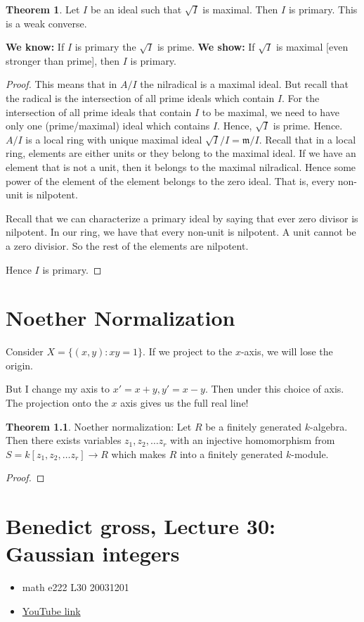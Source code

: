 \documentclass{book}
\newcommand{\m}{\mathfrak{m}}
\newcommand{\rad}{\sqrt} %
\theoremstyle{definition}
\newtheorem{theorem}{Theorem}
\begin{document}
\begin{theorem}
Let $I$ be an ideal such that $\rad I$ is maximal. Then $I$ is primary.
This is a weak converse.

\textbf{We know:} If $I$ is primary the $\rad I$ is prime.
\textbf{We show:}
If $\rad I$ is maximal [even stronger than prime], then $I$ is primary.
\end{theorem}
\begin{proof}
This means that in $A/I$ the nilradical is a maximal ideal. But recall that
the radical is the intersection of all prime ideals which contain $I$. 
For the intersection of all prime ideals that contain $I$ to be maximal, we
need to have only one (prime/maximal) ideal which contains $I$. Hence,
$\rad I$ is prime. Hence. $A/I$ is a local ring with unique maximal ideal
$\rad I/I = \m/I$. Recall that in a local ring, elements are either units
or they belong to the maximal ideal. If we have an element that is not
a unit, then it belongs to the maximal nilradical. Hence some power of 
the element of the element belongs to the zero ideal. That is, every non-unit
is nilpotent.

Recall that we can characterize a primary ideal by saying that ever zero divisor
is nilpotent. In our ring, we have that every non-unit is nilpotent. A unit
cannot be a zero divisior. So the rest of the elements are nilpotent.

Hence $I$ is primary.
\end{proof}


\chapter{Noether Normalization}
Consider $X = \{ (x, y) : xy = 1 \}$. If we project to the $x$-axis,
we will lose the origin.

But I change my axis to $x' = x + y, y' = x - y$. Then under this choice of
axis. The projection onto the $x$ axis gives us the full real line!

\begin{theorem}
Noether normalization: Let $R$ be a finitely generated $k$-algebra. Then there
exists variables $z_1, z_2, \dots z_r$ with an injective homomorphism from $S =
k[z_1, z_2, \dots z_r] \rightarrow R$ which makes $R$ into a finitely generated
$k$-module.
\end{theorem}
\begin{proof} \end{proof}


\chapter{Benedict gross, Lecture 30: Gaussian integers}
\begin{itemize}
    \item math e222 L30 20031201 
    \item \href{https://www.youtube.com/watch?v=itvvxpntpwg&list=PLelIK3uylPMGzHBuR3hLMHrYfMqWWsmx5&index=30}{YouTube link}
\end{itemize}
\end{document}
